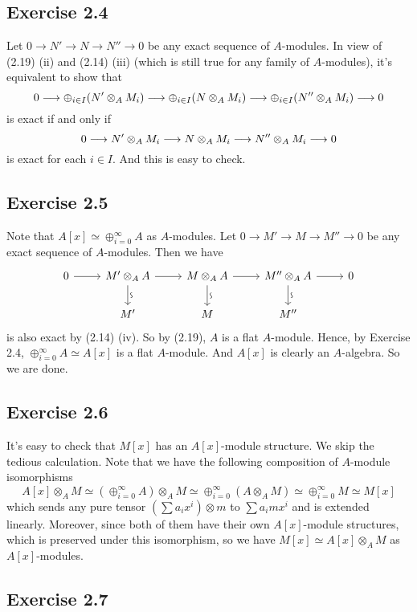 \documentclass[../A&M.tex]{subfiles}
\begin{document}
\subsection*{Exercise 2.4}

Let $0 \to N' \to N \to N'' \to 0$ be any exact sequence of $A$-modules. In view of (2.19) (ii) and (2.14) (iii) (which is still true for any family of $A$-modules), it's equivalent to show that
$$
0 \longrightarrow \oplus_{i \in I} (N' \otimes_A M_i) \longrightarrow \oplus_{i \in I} (N \otimes_A M_i) \longrightarrow \oplus_{i \in I} (N'' \otimes_A M_i) \longrightarrow 0
$$
is exact if and only if
$$
0 \longrightarrow N' \otimes_A M_i \longrightarrow N \otimes_A M_i \longrightarrow N'' \otimes_A M_i \longrightarrow 0
$$
is exact for each $i\in I$. And this is easy to check.

\subsection*{Exercise 2.5}

Note that $A[x] \simeq \oplus_{i=0}^\infty A$ as $A$-modules. Let $0 \to M' \to M \to M'' \to 0$ be any exact sequence of $A$-modules. Then we have
$$
\begin{tikzcd}
0 \arrow{r} & M' \otimes_A A \arrow{r} \isoarrow{d} & M \otimes_A A \arrow{r} \isoarrow{d} & M'' \otimes_A A \arrow{r} \isoarrow{d} & 0 \\ 
 & M' & M & M'' 
\end{tikzcd}
$$
is also exact by (2.14) (iv). So by (2.19), $A$ is a flat $A$-module. Hence, by Exercise 2.4, $ \oplus_{i=0}^\infty A \simeq A[x]$ is a flat $A$-module. And $A[x]$ is clearly an $A$-algebra. So we are done.

\subsection*{Exercise 2.6}

It's easy to check that $M[x]$ has an $A[x]$-module structure. We skip the tedious calculation. Note that we have the following composition of $A$-module isomorphisms
$$
A[x] \otimes_A M
\simeq (\oplus_{i=0}^\infty A) \otimes_A M
\simeq \oplus_{i=0}^\infty (A \otimes_A M)
\simeq \oplus_{i=0}^\infty M
\simeq M[x] 
$$
which sends any pure tensor $(\sum a_ix^i) \otimes m$ to $\sum a_imx^i$ and is extended linearly. Moreover, since both of them have their own $A[x]$-module structures, which is preserved under this isomorphism, so we have $M[x] \simeq A[x] \otimes_A M$ as $A[x]$-modules.

\subsection*{Exercise 2.7}
\end{document}
